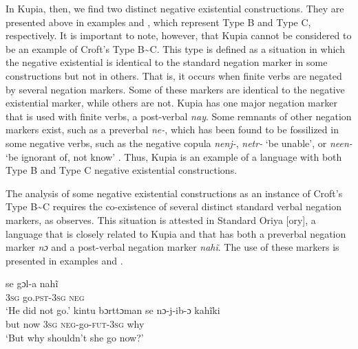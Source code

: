 ﻿\documentclass[output=paper]{langsci/langscibook}
\begin{document}
In Kupia, then, we find two distinct negative existential
constructions. They are presented above in examples
 and , which
represent Type B and Type C, respectively. It is important to note,
however, that Kupia cannot be considered to be an example of Croft's Type
B{\textasciitilde}C. This type is defined as a situation in which the
negative existential is identical to the standard negation marker in some
constructions but not in others. That is, it occurs when finite verbs are
negated by several negation markers. Some of these markers are identical to
the negative existential marker, while others are not. Kupia has
one major negation marker that is used with finite verbs, a post-verbal
\textit{nay}. Some remnants of other negation markers exist, such as a
preverbal \textit{ne-}, which has been found to be fossilized in some
negative verbs, such as the negative copula \textit{nenj-}, \textit{netr-}
`be unable', or \textit{neen-} `be ignorant of, not know'
\parencite[310]{Christmas1973a}. Thus, Kupia is an example of a language with both Type B and Type C negative existential constructions. 

The analysis of some negative existential constructions as an instance of
Croft's Type B{\textasciitilde}C requires the co-existence of several
distinct standard verbal negation markers, as \citet[1329]{Veselinova2014}
observes. This situation is attested in Standard Oriya [ory], a
language that is closely related to Kupia and that has both a preverbal
negation marker \textit{nɔ} and a post-verbal negation marker
\textit{nahĩ}. The use of these markers is presented in examples
 and .
%
\begin{exe}\ex
{}
\begin{xlist}
    \ex\label{ex:ieur-oriya-henotgo}
    \gll se gɔl-a nahĩ \\
      \textsc{3sg}  go.\textsc{pst-3sg} \textsc{neg} \\
    \glt `He did not go.'
\ex\label{ex:ieur-oriya-shouldgo}
\gll kintu bɔrttɔman se nɔ-j-ib-ɔ kahĩki\\
but now \textsc{3sg}  \textsc{neg}-go-\textsc{fut-3sg}  why\\
\glt `But why shouldn't she go now?’
\end{xlist}\end{exe}
\end{document}
